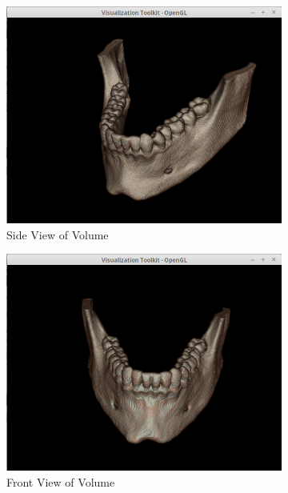 \documentclass[10pt, b5paper]{article}
\begin{document}
\begin{figure}
    \centering
    \begin{subfigure}[b]{0.33\textwidth}
        \centering
        \includegraphics[width=\textwidth]{RCS}
        \caption{Side View of Volume}
    \end{subfigure}
    \hfill
    \begin{subfigure}[b]{0.33\textwidth}
        \centering
        \includegraphics[width=\textwidth]{RCF}
        \caption{Front View of Volume}
    \end{subfigure}
      \hfill
    \begin{subfigure}[b]{0.33\textwidth}

\end{subfigure}
\end{figure}
\end{document}
